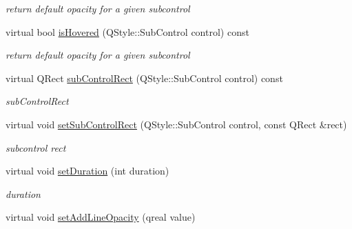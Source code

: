 \begin{DoxyCompactItemize}
\begin{DoxyCompactList}\small\item\em return default opacity for a given subcontrol \end{DoxyCompactList}\item 
\mbox{\label{class_scroll_bar_data_aa6e5fb31dcc19c0bfb8d10b6011f5e8c}} 
virtual bool \hyperlink{class_scroll_bar_data_aa6e5fb31dcc19c0bfb8d10b6011f5e8c}{is\+Hovered} (Q\+Style\+::\+Sub\+Control control) const
\begin{DoxyCompactList}\small\item\em return default opacity for a given subcontrol \end{DoxyCompactList}\item 
\mbox{\label{class_scroll_bar_data_ac80bc66c1ed0bdae0c2bfa604c19fb1f}} 
virtual Q\+Rect \hyperlink{class_scroll_bar_data_ac80bc66c1ed0bdae0c2bfa604c19fb1f}{sub\+Control\+Rect} (Q\+Style\+::\+Sub\+Control control) const
\begin{DoxyCompactList}\small\item\em sub\+Control\+Rect \end{DoxyCompactList}\item 
\mbox{\label{class_scroll_bar_data_a74332b431f73f7b53b04b73f5e1a59ca}} 
virtual void \hyperlink{class_scroll_bar_data_a74332b431f73f7b53b04b73f5e1a59ca}{set\+Sub\+Control\+Rect} (Q\+Style\+::\+Sub\+Control control, const Q\+Rect \&rect)
\begin{DoxyCompactList}\small\item\em subcontrol rect \end{DoxyCompactList}\item 
\mbox{\label{class_scroll_bar_data_a5f7fe91858fb4954e206e510b7fb4410}} 
virtual void \hyperlink{class_scroll_bar_data_a5f7fe91858fb4954e206e510b7fb4410}{set\+Duration} (int duration)
\begin{DoxyCompactList}\small\item\em duration \end{DoxyCompactList}\item 
\mbox{\label{class_scroll_bar_data_a8f02978d0eb2ff7ddf5f61d54ac2177e}} 
virtual void \hyperlink{class_scroll_bar_data_a8f02978d0eb2ff7ddf5f61d54ac2177e}{set\+Add\+Line\+Opacity} (qreal value)

\end{DoxyCompactItemize}
